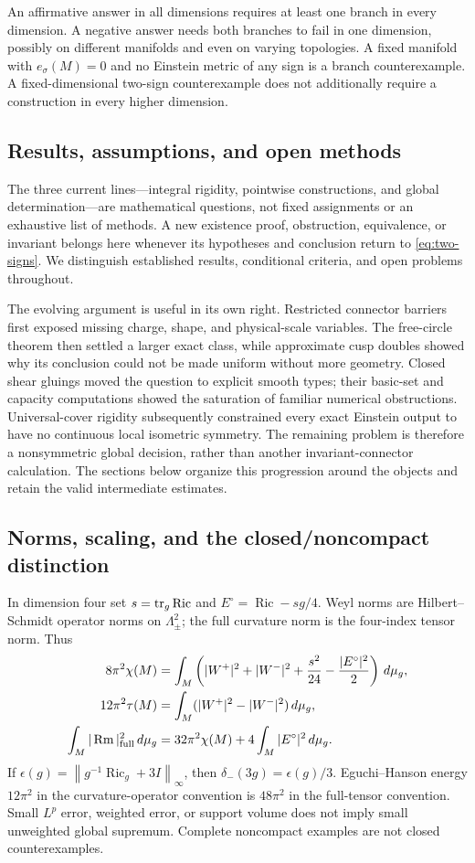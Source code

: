 \documentclass[11pt]{article}
\DeclareMathOperator{\Ric}{Ric}\DeclareMathOperator{\Rm}{Rm}
\newcommand{\dd}{\,d\mu_g}\newcommand{\op}{\mathrm{op}}
\newcommand{\norm}[1]{\left\|#1\right\|}
\theoremstyle{definition}\newtheorem{problem}[theorem]{Open problem}
\theoremstyle{remark}\newtheorem{remark}[theorem]{Scope}
\numberwithin{equation}{section}
\begin{document}
An affirmative answer in all dimensions requires at least one branch in every dimension. A negative answer needs both branches to fail in one dimension, possibly on different manifolds and even on varying topologies. A fixed manifold with $e_\sigma(M)=0$ and no Einstein metric of any sign is a branch counterexample. A fixed-dimensional two-sign counterexample does not additionally require a construction in every higher dimension.

\subsection{Results, assumptions, and open methods}\label{sec:status}
The three current lines---integral rigidity, pointwise constructions, and global determination---are mathematical questions, not fixed assignments or an exhaustive list of methods. A new existence proof, obstruction, equivalence, or invariant belongs here whenever its hypotheses and conclusion return to \eqref{eq:two-signs}. We distinguish established results, conditional criteria, and open problems throughout.

The evolving argument is useful in its own right. Restricted connector barriers first exposed missing charge, shape, and physical-scale variables. The free-circle theorem then settled a larger exact class, while approximate cusp doubles showed why its conclusion could not be made uniform without more geometry. Closed shear gluings moved the question to explicit smooth types; their basic-set and capacity computations showed the saturation of familiar numerical obstructions. Universal-cover rigidity subsequently constrained every exact Einstein output to have no continuous local isometric symmetry. The remaining problem is therefore a nonsymmetric global decision, rather than another invariant-connector calculation. The sections below organize this progression around the objects and retain the valid intermediate estimates.

\subsection{Norms, scaling, and the closed/noncompact distinction}\label{sec:conventions}
In dimension four set $s=\tr_g\Ric$ and $E^\circ=\Ric-sg/4$. Weyl norms are Hilbert--Schmidt operator norms on $\Lambda^2_\pm$; the full curvature norm is the four-index tensor norm. Thus
\begin{align}
8\pi^2\chi(M)&=\int_M\left(|W^+|^2+|W^-|^2+\frac{s^2}{24}-\frac{|E^\circ|^2}{2}\right)\dd,\label{eq:cgb}\\
12\pi^2\tau(M)&=\int_M(|W^+|^2-|W^-|^2)\dd,\label{eq:signature}\\
\int_M|\Rm|_{\rm full}^2\dd&=32\pi^2\chi(M)+4\int_M|E^\circ|^2\dd.\label{eq:energy}
\end{align}
If $\epsilon(g)=\norm{g^{-1}\Ric_g+3I}_\infty$, then $\delta_-(3g)=\epsilon(g)/3$. Eguchi--Hanson energy $12\pi^2$ in the curvature-operator convention is $48\pi^2$ in the full-tensor convention. Small $L^p$ error, weighted error, or support volume does not imply small unweighted global supremum. Complete noncompact examples are not closed counterexamples.
\end{document}
